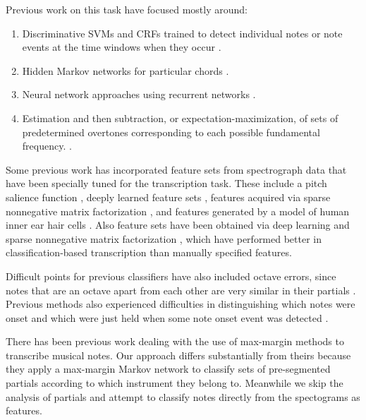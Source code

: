\documentclass{article}
\begin{document}
Previous work on this task have focused mostly around:
\begin{enumerate}
\item Discriminative SVMs and CRFs trained to detect individual notes
  or note events at the time windows when they occur
  \cite{ryynanen2005polyphonic} \cite{poliner2006discriminative}
  \cite{gang2009polyphonic}.
\item Hidden Markov networks for particular chords \cite{raphael2002automatic}.
\item Neural network approaches using recurrent networks
  \cite{marolt2004connectionist} \cite{bock2012polyphonic}.
\item Estimation and then subtraction, or expectation-maximization, of sets of
  predetermined overtones corresponding to each possible fundamental frequency.
  \cite{5946322}.
\end{enumerate}

  Some previous work has incorporated feature sets from spectrograph
  data that have been specially tuned for the transcription task.
  These include a pitch salience function \cite{5946322}, deeply learned
  feature sets \cite{nam2011classification}, features acquired via sparse
  nonnegative matrix factorization \cite{costantini2013nmf}, and features
  generated by a model of human inner ear hair cells
  \cite{marolt2004connectionist}. Also feature sets have
been obtained via deep learning \cite{nam2011classification} and sparse
nonnegative matrix factorization \cite{costantini2013nmf}, which have performed
better in classification-based transcription than manually specified features.

Difficult points for previous classifiers have also included octave errors,
since notes that are an octave apart from each other are very similar in
their partials \cite{bock2012polyphonic} \cite{poliner2006discriminative}.
Previous methods also experienced
difficulties in distinguishing which notes were onset and which were just held
when some note onset event was detected \cite{marolt2004connectionist}.

There has been previous work \cite{gang2009polyphonic} dealing with the use
of max-margin methods to transcribe musical notes. Our approach differs
substantially from theirs because they apply a max-margin Markov network to
classify sets of pre-segmented partials according to which instrument they
belong to. Meanwhile we skip the analysis of partials and attempt to classify
notes directly from the spectograms as features. 
\end{document}
